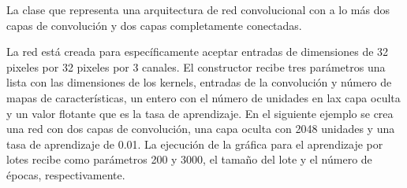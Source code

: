 La clase que representa una arquitectura de red convolucional con a lo más
dos capas de convolución y dos capas completamente conectadas.

La red está creada para específicamente aceptar entradas de dimensiones
de 32 pixeles por 32 pixeles por 3 canales. El constructor recibe tres parámetros
una lista con las dimensiones de los kernels, entradas de la convolución y
número de mapas de características, un entero con el número de unidades en lax
capa oculta y un valor flotante que es la tasa de aprendizaje.
En el siguiente ejemplo se crea una red con dos capas de convolución,
una capa oculta con 2048 unidades y una tasa de aprendizaje de 0.01. La ejecución de la gráfica
para el aprendizaje por lotes recibe como parámetros 200 y 3000,
el tamaño del lote y el número de épocas, respectivamente.

%
\begin{sphinxVerbatim}[commandchars=\\\{\}]
   
  \PYG{p}{[}\PYG{p}{[}   \PYG{p}{]} \PYG{p}{[}   \PYG{p}{]}\PYG{p}{]}  
 
\end{sphinxVerbatim}




